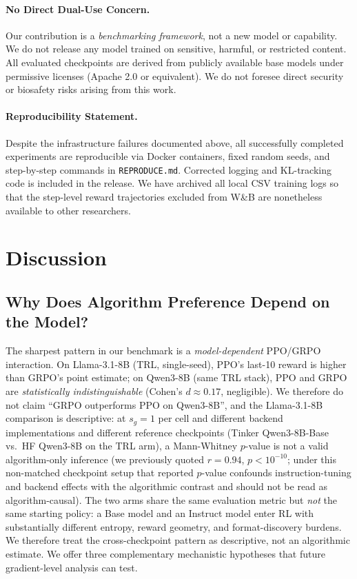 \documentclass{article}
\begin{document}
\paragraph{No Direct Dual-Use Concern.}
Our contribution is a \emph{benchmarking framework}, not a new model or
capability. We do not release any model trained on sensitive, harmful, or
restricted content. All evaluated checkpoints are derived from publicly
available base models under permissive licenses (Apache 2.0 or equivalent).
We do not foresee direct security or biosafety risks arising from this work.

\paragraph{Reproducibility Statement.}
Despite the infrastructure failures documented above, all successfully
completed experiments are reproducible via Docker containers, fixed random
seeds, and step-by-step commands in \texttt{REPRODUCE.md}. Corrected logging
and KL-tracking code is included in the release. We have archived all local
CSV training logs so that the step-level reward trajectories excluded from
W\&B are nonetheless available to other researchers.

\section{Discussion}
\label{sec:discussion}

\subsection{Why Does Algorithm Preference Depend on the Model?}
\label{sec:discuss_model_algo}

The sharpest pattern in our benchmark is a \emph{model-dependent}
PPO/GRPO interaction. On Llama-3.1-8B (TRL, single-seed), PPO's
last-10 reward is higher than GRPO's point estimate; on Qwen3-8B
(same TRL stack), PPO and GRPO are \emph{statistically
indistinguishable} (Cohen's $d \approx 0.17$, negligible).
We therefore do not claim ``GRPO outperforms PPO on Qwen3-8B'', and
the Llama-3.1-8B comparison is descriptive: at $s_g{=}1$ per cell
and different backend implementations and different reference
checkpoints (Tinker Qwen3-8B-Base vs.\ HF Qwen3-8B on the TRL
arm), a Mann-Whitney $p$-value is not a valid algorithm-only
inference (we previously quoted $r = 0.94$, $p < 10^{-10}$;
under this non-matched checkpoint setup that reported $p$-value
confounds instruction-tuning and backend effects with the
algorithmic contrast and should not be read as algorithm-causal).
The two arms share the same evaluation metric but \emph{not} the
same starting policy: a Base model and an Instruct model enter RL
with substantially different entropy, reward geometry, and
format-discovery burdens. We therefore treat the cross-checkpoint
pattern as descriptive, not an algorithmic estimate. We offer three complementary mechanistic hypotheses that
future gradient-level analysis can test.
\end{document}
